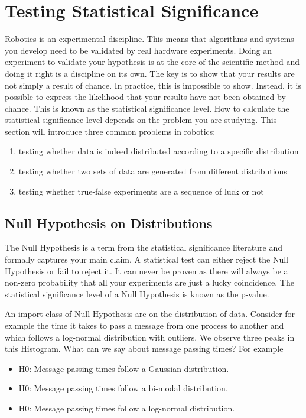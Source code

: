 \section{Testing Statistical Significance}\label{sec:stattest}
Robotics is an experimental discipline. This means that algorithms and systems you develop need to be validated by real hardware experiments. Doing an experiment to validate your hypothesis is at the core of the scientific method and doing it right is a discipline on its own. The key is to show that your results are not simply a result of chance. In practice, this is impossible to show. Instead, it is possible to express the likelihood that your results have not been obtained by chance. This is known as the statistical significance level. How to calculate the statistical significance level depends on the problem you are studying. This section will introduce three common problems in robotics:

\begin{enumerate}
\item testing whether data is indeed distributed according to a specific distribution
\item testing whether two sets of data are generated from different distributions
\item testing whether true-false experiments are a sequence of luck or not
\end{enumerate}

\subsection{Null Hypothesis on Distributions}
The Null Hypothesis is a term from the statistical significance literature and formally captures your main claim. A statistical test can either reject the Null Hypothesis or fail to reject it. It can never be proven as there will always be a non-zero probability that all your experiments are just a lucky coincidence. The statistical significance level of a Null Hypothesis is known as the p-value.

An import class of Null Hypothesis are on the distribution of data. Consider for example the time it takes to pass a message from one process to another and which follows a log-normal distribution with outliers.
We observe three peaks in this Histogram. What can we say about message passing times? For example
\begin{itemize}
\item H0: Message passing times follow a Gaussian distribution.
\item H0: Message passing times follow a bi-modal distribution.
\item H0: Message passing times follow a log-normal distribution.
\end{itemize}

